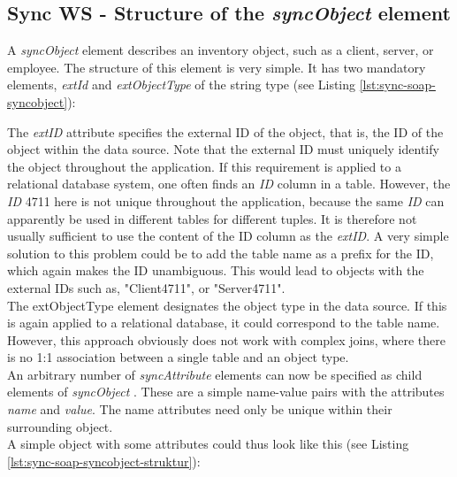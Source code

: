 \documentclass[a4paper,10pt]{book}
\begin{document}
\subsection{Sync WS - Structure of the \textit{syncObject} element}
A \textit{syncObject} element describes an inventory object, such as a client, server, or employee. The structure
of this element is very simple. It has two mandatory elements, \textit{extId}
and \textit{extObjectType} of the string type (see Listing \ref{lst:sync-soap-syncobject}):

\lstset{language=XML}



The \textit{extID} attribute specifies the external ID of the object, that is, the ID of the object within the data source.
Note that the external ID must uniquely identify the object throughout the application. If this requirement is applied
to a relational database system, one often finds an \textit{ID} column in a table. However, the \textit{ID} 4711 here is not unique
throughout the application, because the same \textit{ID} can apparently be used in different tables for different tuples.
It is therefore not usually sufficient to use the content of the ID column as the \textit{extID}. A very simple solution
to this problem could be to add the table name as a prefix for the ID, which again makes the ID unambiguous. This would
lead to objects with the external IDs such as, "Client4711", or "Server4711".
\newline\\
The extObjectType element designates the object type in the data source. If this
is again applied to a relational database, it could correspond to the table name. However, this approach obviously does not work with complex joins,
where there is no 1:1 association between a single table and an object type.
\newline\\
An arbitrary number of \textit{syncAttribute} elements can now be specified as child elements of
\textit{syncObject} . These are a simple name-value pairs with the attributes \textit{name} and \textit{value}.
The name attributes need only be unique within their surrounding object.
\newline\\
A simple object with some attributes could thus look like this (see Listing \ref{lst:sync-soap-syncobject-struktur}):

\lstset{language=XML}

\end{document}
